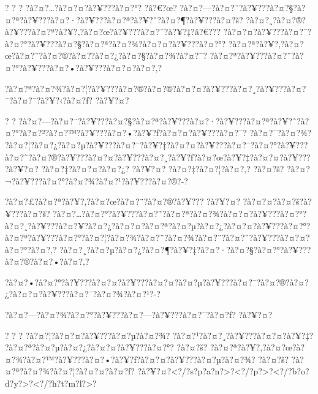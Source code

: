 \documentclass[11pt, openany]{book}
\begin{document}
{{{{{{{{{{{{{{? ? ? ?à?¤?\ldots{}?à?¤?¤?à?¥???à?¤?°? ?â?€?œ?
?à?¤?---?à?¤?¨?à?¥???à?¤?§?à?¤?ª?à?¥???à?¤?·?à?¥???à?¤?ª?à?¥?ˆ?à?¤?¶?à?¥???à?¤?š?
?à?¤?¸?à?¤?®?à?¥???à?¤?ª?à?¥?‚?à?¤?œ?à?¥???à?¤?¯?à?¥?‡?â?€???
?à?¤?¤?à?¥???à?¤?¯?à?¤?°?à?¥???à?¤?§?à?¤?ª?à?¤?¾?à?¤?¤?à?¥???à?¤?°?
?à?¤?ª?à?¥?‚?à?¤?œ?à?¤?¨?à?¤?®?à?¤?­?à?¤?¿?à?¤?§?à?¤?¾?à?¤?¯?
?à?¤?ª?à?¥???à?¤?¨?à?¤?°?à?¥???à?¤?•?à?¥???à?¤?¤?à?¤?‚?

?à?¤?ª?à?¤?¾?à?¤?¦?à?¥???à?¤?®?à?¤?®?à?¤?¤?à?¥???à?¤?¸?à?¥???à?¤?¯?à?¤?¯?à?¥?‹?à?¤?ƒ?
?à?¥?¤?

? ?
?à?¤?---?à?¤?¨?à?¥???à?¤?§?à?¤?ª?à?¥???à?¤?·?à?¥???à?¤?ª?à?¥?ˆ?à?¤?°?à?¤?²?à?¤?™?à?¥???à?¤?•?à?¥?ƒ?à?¤?¤?à?¥???à?¤?¯?
?à?¤?¯?à?¤?¾?
?à?¤?¦?à?¤?¿?à?¤?µ?à?¥???à?¤?¯?à?¥?‡?à?¤?¤?à?¥???à?¤?¯?à?¤?°?à?¥???à?¤?˜?à?¤?®?à?¥???à?¤?¤?à?¥???à?¤?¸?à?¥?ƒ?à?¤?œ?à?¥?‡?à?¤?¤?à?¥???
?à?¥?¤? ?à?¤?‡?à?¤?¤?à?¤?¿? ?à?¥?¤? ?à?¤?‡?à?¤?¦?à?¤?‚? ?à?¤?š?
?à?¤?¬?à?¥???à?¤?°?à?¤?¾?à?¤?¹?à?¥???à?¤?®?-?

?à?¤?£?à?¤?ª?à?¥?‚?à?¤?œ?à?¤?¨?à?¤?®?à?¥??? ?à?¥?¤?
?à?¤?¤?à?¤?š?à?¥???à?¤?š?
?à?¤?\ldots{}?à?¤?°?à?¥???à?¤?˜?à?¤?ª?à?¤?¾?à?¤?¤?à?¥???à?¤?°?à?¤?¸?à?¥???à?¤?¥?à?¤?¿?à?¤?¤?à?¤?ª?à?¤?µ?à?¤?¿?à?¤?¤?à?¥???à?¤?°?à?¤?ª?à?¥???à?¤?°?à?¤?¦?à?¤?¾?à?¤?¨?à?¤?¾?à?¤?¨?à?¤?¨?à?¥???à?¤?¤?à?¤?°?à?¤?‚?
?à?¤?¸?à?¤?µ?à?¤?¿?à?¤?¶?à?¥?‡?à?¤?·?à?¤?§?à?¤?°?à?¥???à?¤?®?à?¤?•?à?¤?‚?

?à?¤?•?à?¤?°?à?¥???à?¤?¤?à?¥???à?¤?¤?à?¤?µ?à?¥???à?¤?¯?à?¤?®?à?¤?¿?à?¤?¤?à?¥???à?¤?¯?à?¤?¾?à?¤?¹?-?

?à?¤?---?à?¤?¾?à?¤?°?à?¥???à?¤?---?à?¥???à?¤?¯?à?¤?ƒ? ?à?¥?¤?

? ? ? ?à?¤?¦?à?¤?¤?à?¥???à?¤?µ?à?¤?¾? ?à?¤?¹?à?¤?¸?à?¥???à?¤?¤?à?¥?‡?
?à?¤?ª?à?¤?µ?à?¤?¿?à?¤?¤?à?¥???à?¤?°? ?à?¤?š?
?à?¤?ª?à?¥?‚?à?¤?œ?à?¤?¾?à?¤?™?à?¥???à?¤?•?à?¥?ƒ?à?¤?¤?à?¥???à?¤?µ?à?¤?¾?
?à?¤?š? ?à?¤?ª?à?¤?¾?à?¤?¦?à?¤?¤?à?¤?ƒ?
?à?¥?¤?\textless{}?/?s?p?a?n?\textgreater{}?\textless{}?/?p?\textgreater{}?\textless{}?/?b?o?d?y?\textgreater{}?\textless{}?/?h?t?m?l?\textgreater{}?

}}}}}}}}}}}}}}
\end{document}
